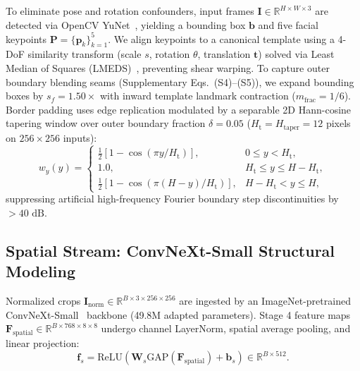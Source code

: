\documentclass[10pt,twocolumn,letterpaper]{article}
\begin{document}
To eliminate pose and rotation confounders, input frames $\mathbf{I} \in \mathbb{R}^{H \times W \times 3}$ are detected via OpenCV YuNet~\cite{yunet2023opencv}, yielding a bounding box $\mathbf{b}$ and five facial keypoints $\mathbf{P} = \{\mathbf{p}_k\}_{k=1}^5$. We align keypoints to a canonical template using a 4-DoF similarity transform (scale $s$, rotation $\theta$, translation $\mathbf{t}$) solved via Least Median of Squares (LMEDS)~\cite{rousseeuw1984least}, preventing shear warping. To capture outer boundary blending seams (Supplementary Eqs.~(S4)--(S5)), we expand bounding boxes by $s_f = 1.50\times$ with inward template landmark contraction ($m_{\mathrm{frac}} = 1/6$). Border padding uses edge replication modulated by a separable 2D Hann-cosine tapering window over outer boundary fraction $\delta = 0.05$ ($H_{\mathrm{t}} = H_{\mathrm{taper}} = 12$ pixels on $256 \times 256$ inputs):
\begin{equation}
\label{eq:hann_window_1d}
w_y(y) = \begin{cases}
\tfrac{1}{2}[1 - \cos(\pi y / H_{\mathrm{t}})], & 0 \le y < H_{\mathrm{t}}, \\
1.0, & H_{\mathrm{t}} \le y \le H\!-\!H_{\mathrm{t}}, \\
\tfrac{1}{2}[1 - \cos(\pi (H\!-\!y) / H_{\mathrm{t}})], & H\!-\!H_{\mathrm{t}} < y \le H,
\end{cases}
\end{equation}
suppressing artificial high-frequency Fourier boundary step discontinuities by $>40\text{ dB}$.

\subsection{Spatial Stream: ConvNeXt-Small Structural Modeling}
\label{sec:method_spatial}

Normalized crops $\mathbf{I}_{\mathrm{norm}} \in \mathbb{R}^{B \times 3 \times 256 \times 256}$ are ingested by an ImageNet-pretrained ConvNeXt-Small~\cite{liu2022convnet} backbone (49.8M adapted parameters). Stage 4 feature maps $\mathbf{F}_{\mathrm{spatial}} \in \mathbb{R}^{B \times 768 \times 8 \times 8}$ undergo channel LayerNorm, spatial average pooling, and linear projection:
\begin{equation}
\label{eq:spatial_embedding}
\mathbf{f}_s = \mathrm{ReLU}\left( \mathbf{W}_s \mathrm{GAP}(\mathbf{F}_{\mathrm{spatial}}) + \mathbf{b}_s \right) \in \mathbb{R}^{B \times 512}.
\end{equation}
\end{document}
